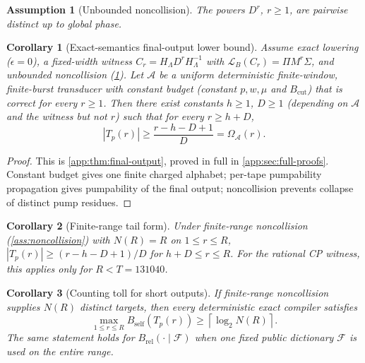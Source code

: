 \documentclass[aps,prx,reprint,floatfix,superscriptaddress]{revtex4-2}
\newtheorem{corollary}{Corollary}
\newtheorem{assumption}{Assumption}
\begin{document}
\begin{assumption}[Unbounded noncollision]
\label{ass:unbounded-noncollision}
The powers $D^r$, $r \geq 1$, are pairwise distinct up to global phase.
\end{assumption}

\begin{corollary}[Exact-semantics final-output lower bound]
\label{cor:exact-semantics-corollary}
\label{thm:final-output}
Assume exact lowering ($\epsilon = 0$), a fixed-width witness
$C_r = H_\Lambda D^r H_\Lambda^{-1}$ with
$\mathcal{L}_B(C_r) = \Pi M^r \Sigma$, and unbounded noncollision
(\cref{ass:unbounded-noncollision}). Let $\mathcal{A}$ be a uniform
deterministic finite-window, finite-burst transducer with constant budget
(constant $p,w,\mu$ and $B_{\mathrm{cut}}$) that is correct for every
$r \geq 1$. Then there exist constants
$h \geq 1$, $D \geq 1$ (depending on $\mathcal{A}$ and the witness but not
$r$) such that for every $r \geq h + D$,
\begin{equation}\label{eq:exact-output-bound}
  |T_p(r)| \geq \frac{r-h-D+1}{D} = \Omega_{\mathcal{A}}(r).
\end{equation}
\end{corollary}

\begin{proof}
This is \cref{app:thm:final-output}, proved in full in
\cref{app:sec:full-proofs}. Constant budget gives one finite
charged alphabet; per-tape pumpability propagation gives pumpability of the
final output; noncollision prevents collapse of distinct pump residues.
\end{proof}

\begin{corollary}[Finite-range tail form]
\label{cor:finite-tail}
Under finite-range noncollision (\cref{ass:noncollision}) with $N(R)=R$ on
$1 \leq r \leq R$, $|T_p(r)| \geq (r-h-D+1)/D$ for $h+D \leq r \leq R$.
For the rational CP witness, this applies only for $R < T = 131040$.
\end{corollary}

\begin{corollary}[Counting toll for short outputs]
\label{cor:counting-toll}
If finite-range noncollision supplies $N(R)$ distinct targets, then every
deterministic exact compiler satisfies
\begin{equation*}
 \max_{1\leq r\leq R}B_{\mathrm{self}}(T_p(r))
 \geq \left\lceil\log_2N(R)\right\rceil.
\end{equation*}
The same statement holds for $B_{\mathrm{rel}}(\cdot\mid\mathcal F)$
when one fixed public dictionary $\mathcal F$ is used on the entire range.
\end{corollary}
\end{document}
